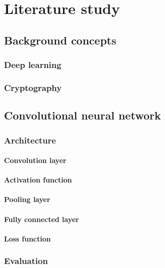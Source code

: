 
\chapter{Literature study}

\section{Background concepts}
\subsection{Deep learning}
\subsection{Cryptography}

\section{Convolutional neural network}
\subsection{Architecture}
\subsubsection{Convolution layer}
\subsubsection{Activation function}
\subsubsection{Pooling layer}
\subsubsection{Fully connected layer}
\subsubsection{Loss function}
\subsection{Evaluation}


